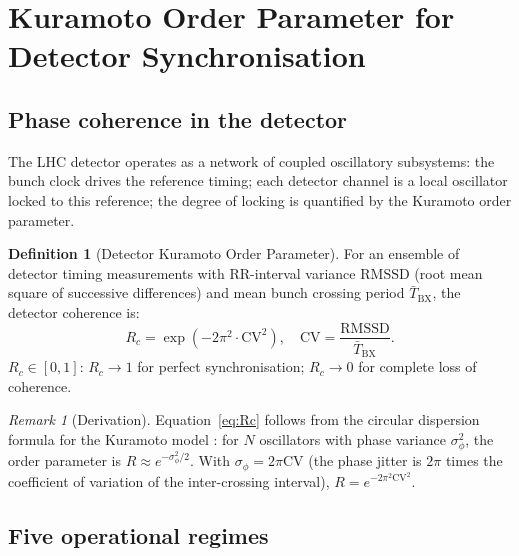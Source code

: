 \documentclass[twocolumn,10pt,a4paper]{article}
\theoremstyle{thmstyle}
\theoremstyle{definition}
\newtheorem{definition}[theorem]{Definition}
\theoremstyle{remark}
\newtheorem{remark}[theorem]{Remark}
\begin{document}
\section{Kuramoto Order Parameter for Detector Synchronisation}
\label{sec:kuramoto}

\subsection{Phase coherence in the detector}

The LHC detector operates as a network of coupled oscillatory subsystems:
the bunch clock drives the reference timing; each detector channel is
a local oscillator locked to this reference; the degree of locking
is quantified by the Kuramoto order parameter.

\begin{definition}[Detector Kuramoto Order Parameter]
\label{def:kuramoto}
For an ensemble of detector timing measurements with RR-interval variance
$\mathrm{RMSSD}$ (root mean square of successive differences) and mean
bunch crossing period $\bar T_{\mathrm{BX}}$, the detector coherence is:
\begin{equation}
R_c = \exp\!\left(-2\pi^2 \cdot \mathrm{CV}^2\right),
\quad \mathrm{CV} = \frac{\mathrm{RMSSD}}{\bar T_{\mathrm{BX}}}.
\label{eq:Rc}
\end{equation}
$R_c \in [0,1]$: $R_c \to 1$ for perfect synchronisation; $R_c \to 0$
for complete loss of coherence.
\end{definition}

\begin{remark}[Derivation]
Equation~\eqref{eq:Rc} follows from the circular dispersion formula
for the Kuramoto model \citep{kuramoto1975}: for $N$ oscillators with
phase variance $\sigma_\phi^2$, the order parameter is
$R \approx e^{-\sigma_\phi^2/2}$. With $\sigma_\phi = 2\pi\mathrm{CV}$
(the phase jitter is $2\pi$ times the coefficient of variation of the
inter-crossing interval), $R = e^{-2\pi^2\mathrm{CV}^2}$.
\end{remark}

\subsection{Five operational regimes}
\end{document}
